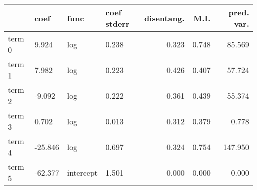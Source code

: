 \documentclass{article}%
\begin{document}
             \vfill \pagebreak%


\begin{table}[H]%
\centering%
\footnotesize%
\begin{tabular}{llllrrr}
\toprule
{} &     coef &       func & coef stderr &  disentang. &   M.I. &  pred. var. \\
\midrule
term 0 &    9.924 &        log &       0.238 &       0.323 &  0.748 &      85.569 \\
term 1 &    7.982 &        log &       0.223 &       0.426 &  0.407 &      57.724 \\
term 2 &   -9.092 &        log &       0.222 &       0.361 &  0.439 &      55.374 \\
term 3 &    0.702 &        log &       0.013 &       0.312 &  0.379 &       0.778 \\
term 4 &  -25.846 &        log &       0.697 &       0.324 &  0.754 &     147.950 \\
term 5 &  -62.377 &  intercept &       1.501 &       0.000 &  0.000 &       0.000 \\
\bottomrule
\end{tabular}
%
\end{table}

%
\vfill \pagebreak

%
\end{document}
